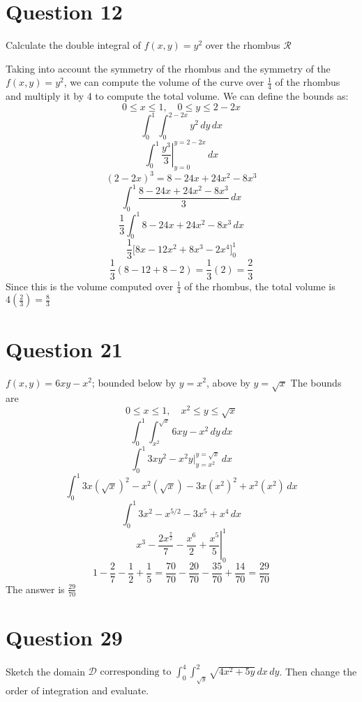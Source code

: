 \documentclass[hidelinks]{article}
\begin{document}
\newpage
\section{Question 12}
Calculate the double integral of $f(x,y) = y^2$ over the rhombus $\mathcal{R}$

Taking into account the symmetry of the rhombus and the symmetry of the $f(x,y) = y^2$, we can compute the volume of the curve over $\frac{1}{4}$ of the rhombus and multiply it by 4 to compute the total volume. 
We can define the bounds as: 
\[
    0 \leq x \leq 1, \quad 0 \leq y \leq 2-2x
\]
\[
    \int_{0}^1 \int_{0}^{2-2x} y^2 \, dy \, dx
\]
\[
    \int_{0}^1 \left. \frac{y^3}{3} \right |_{y = 0}^{y = 2-2x} \, dx
\]
\[
    (2-2x)^3 = 8 - 24x + 24x^2 - 8x^3
\]
\[
    \int_{0}^1 \frac{8 - 24x + 24x^2 - 8x^3}{3} \, dx
\]
\[
    \frac{1}{3}\int_{0}^1 8 - 24x + 24x^2 - 8x^3 \, dx
\]
\[
    \frac{1}{3} \Big [8x-12x^2 + 8x^3 - 2x^4 \Big ]_{0}^{1}
\]
\[
    \frac{1}{3} (8-12+8-2) = \frac{1}{3} (2) = \frac{2}{3}
\]
Since this is the volume computed over $\frac{1}{4}$ of the rhombus, the total volume is $4(\frac{2}{3}) = \frac{8}{3}$

\newpage

\section{Question 21}
$f(x,y) = 6xy-x^2$; bounded below by $y =x^2$, above by $y = \sqrt{x}$
The bounds are 
\[
    0 \leq x \leq 1, \quad x^2 \leq y \leq \sqrt{x}
\]
\[
    \int_{0}^1 \int_{x^2}^{\sqrt{x}} 6xy - x^2 \, dy \, dx
\]
\[
    \int_0^1 3xy^2 - x^2y \Big |_{y = x^2}^{y = \sqrt{x}} \, dx
\]
\[
    \int_0^1 3x(\sqrt{x})^2 - x^2(\sqrt{x}) - 3x(x^2)^2 + x^2(x^2) \, dx
\]
\[
    \int_0^1 3x^2 - x^{5/2} - 3x^5 + x^4 \, dx
\]
\[
    \left . x^3 - \frac{2x^{\frac{7}{2}}}{7} - \frac{x^6}{2} + \frac{x^5}{5} \right |_{0}^{1}
\]
\[
    1 - \frac{2}{7} - \frac{1}{2} + \frac{1}{5} = \frac{70}{70} - \frac{20}{70} - \frac{35}{70} + \frac{14}{70} = \frac{29}{70}
\]
The answer is $\frac{29}{70}$
\newpage
\section{Question 29}
Sketch the domain $\mathcal{D} \text{ corresponding to } \int_0^4 \int_{\sqrt{y}}^2 \sqrt{4x^2 + 5y} \, dx \, dy$. Then change the order of integration and evaluate. 
\end{document}
